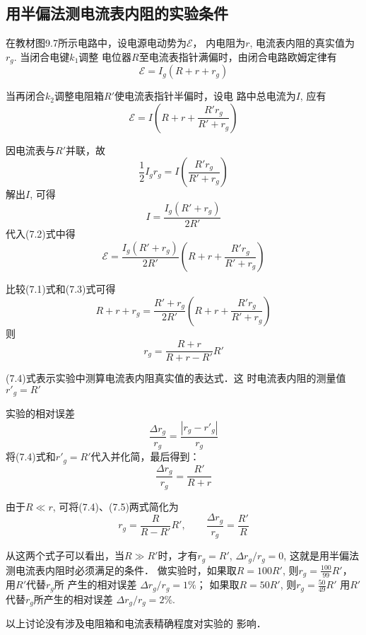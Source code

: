 \subsection{用半偏法测电流表内阻的实验条件}
在教材图9.7所示电路中，设电源电动势为$\mathcal{E}$，
内电阻为$r$, 电流表内阻的真实值为$r_g$. 当闭合电键$k_1$调整
电位器$R$至电流表指针满偏时，由闭合电路欧姆定律有
\begin{equation}
    \mathcal{E}=I_g(R+r+r_g)
\end{equation}

当再闭合$k_2$调整电阻箱$R'$使电流表指针半偏时，设电
路中总电流为$I$, 应有
\begin{equation}
    \mathcal{E}=I\left(R+r+\frac{R'r_g}{R'+r_g}\right)
\end{equation}

因电流表与$R'$并联，故
\begin{equation*}
    \frac{1}{2}I_g r_g=I\left(\frac{R'r_g}{R'+r_g}\right)
\end{equation*}
解出$I$, 可得
\[I=\frac{I_g(R'+r_g)}{2R'}\]
代入(7.2)式中得
\begin{equation}
    \mathcal{E}=\frac{I_g(R'+r_g)}{2R'}\left(R+r+\frac{R'r_g}{R'+r_g}\right)
\end{equation}

比较(7.1)式和(7.3)式可得
\[R+r+r_g=\frac{R'+r_g}{2R'}\left(R+r+\frac{R'r_g}{R'+r_g}\right)\]
则
\begin{equation}
    r_g=\frac{R+r}{R+r-R'}R'
\end{equation}

(7.4)式表示实验中测算电流表内阻真实值的表达式．这
时电流表内阻的测量值$r'_g=R'$

实验的相对误差
\[\frac{\Delta r_g}{r_g}=\frac{|r_g-r'_g|}{r_g}\]
将(7.4)式和$r'_g=R'$代入并化简，最后得到：
\begin{equation}
    \frac{\Delta r_g}{r_g}=\frac{R'}{R+r}
\end{equation}

由于$R\ll r$, 可将(7.4)、(7.5)两式简化为
\[r_g=\frac{R}{R-R'}R',\qquad     \frac{\Delta r_g}{r_g}=\frac{R'}{R}\]

从这两个式子可以看出，当$R\gg R'$时，才有$r_g=R'$,
$\Delta r_g/r_g=0$, 这就是用半偏法测电流表内阻时必须满足的条件．
做实验时，如果取$R=100R'$, 则$r_g=\frac{100}{99}R'$，用$R'$代替$r_g$所
产生的相对误差
$\Delta r_g/r_g=1\%$；
如果取$R=50R'$, 则$r_g=\frac{50}{49}R'$
用$R'$代替$r_g$所产生的相对误差
$\Delta r_g/r_g=2\%$.

以上讨论没有涉及电阻箱和电流表精确程度对实验的
影响．


